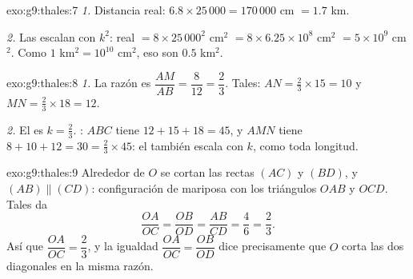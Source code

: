 \begin{solution}{exo:g9:thales:7}
\emph{1.} Distancia real: $6.8 \times 25\,000 = 170\,000$ cm $=
1.7$ km.

\emph{2.} Las  escalan con $k^2$:  real $= 8 \times 25\,000^2$
cm$^2$ $= 8 \times 6.25 \times 10^8$ cm$^2$ $= 5 \times 10^9$ cm$^2$.
Como $1$ km$^2 = 10^{10}$ cm$^2$, eso son $0.5$ km$^2$.
\end{solution}

\begin{solution}{exo:g9:thales:8}
\emph{1.} La razón es $\dfrac{AM}{AB} = \dfrac{8}{12} = \dfrac23$.
Tales: $AN = \frac23 \times 15 = 10$ y $MN = \frac23 \times 18 = 12$.

\emph{2.} El  es $k = \frac23$. : $ABC$ tiene
$12 + 15 + 18 = 45$, y $AMN$ tiene $8 + 10 + 12 = 30 = \frac23 \times
45$: el  también escala con $k$, como toda longitud.
\end{solution}

\begin{solution}{exo:g9:thales:9}
Alrededor de $O$ se cortan las rectas $(AC)$ y $(BD)$, y
$(AB) \parallel (CD)$: configuración de mariposa con los triángulos $OAB$
y $OCD$. Tales da
\[
\frac{OA}{OC} = \frac{OB}{OD} = \frac{AB}{CD} = \frac46 = \frac23 .
\]
Así que $\dfrac{OA}{OC} = \dfrac23$, y la igualdad
$\dfrac{OA}{OC} = \dfrac{OB}{OD}$ dice precisamente que $O$ corta las dos
diagonales en la misma razón.
\end{solution}

